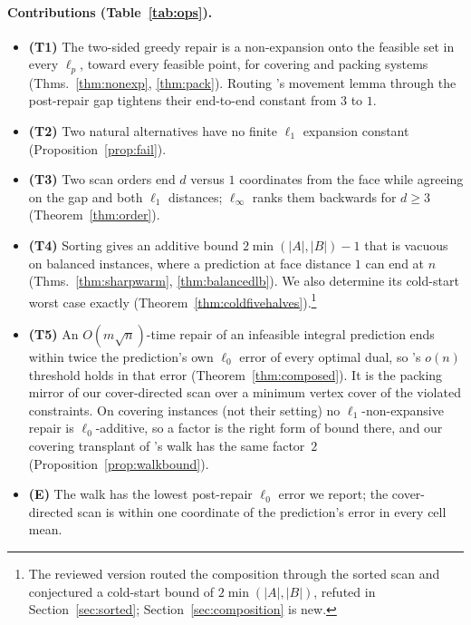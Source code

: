 \paragraph{Contributions (Table~\ref{tab:ops}).}
\begin{itemize}\setlength{\itemsep}{0pt}
\item \textbf{(T1)} The two-sided greedy repair is a non-expansion onto the feasible set in every
$\ell_p$, toward every feasible point, for covering and packing systems (Thms.~\ref{thm:nonexp},
\ref{thm:pack}). Routing \citeauthor{dinitz2021}'s movement lemma through the post-repair gap
tightens their end-to-end constant from $3$ to $1$.
\item \textbf{(T2)} Two natural alternatives have no finite $\ell_1$ expansion constant
(Proposition~\ref{prop:fail}).
\item \textbf{(T3)} Two scan orders end $d$ versus $1$ coordinates from the face while agreeing on
the gap and both $\ell_1$ distances; $\ell_\infty$ ranks them backwards for $d \ge 3$
(Theorem~\ref{thm:order}).
\item \textbf{(T4)} Sorting gives an additive bound $2\min(|A|,|B|)-1$ that is vacuous on balanced
instances, where a prediction at face distance $1$ can end at $n$ (Thms.~\ref{thm:sharpwarm},
\ref{thm:balancedlb}). We also determine its cold-start worst case
exactly (Theorem~\ref{thm:coldfivehalves}).\footnote{The reviewed version routed the composition through the sorted scan and conjectured a
cold-start bound of $2\min(|A|,|B|)$, refuted in Section~\ref{sec:sorted}; Section~\ref{sec:composition} is new.}
\item \textbf{(T5)} An $O(m\sqrt{n})$-time repair of an infeasible integral prediction ends within
twice the prediction's own $\ell_0$ error of every optimal dual, so \citeauthor{chen2022}'s $o(n)$
threshold holds in that error (Theorem~\ref{thm:composed}). It is the packing mirror of our
cover-directed scan over a minimum vertex cover of the violated constraints. On covering instances (not their setting) no $\ell_1$-non-expansive repair is
$\ell_0$-additive, so a factor is the right form of bound there, and our covering transplant of
\citeauthor{dinitz2021}'s walk has the same factor~$2$ (Proposition~\ref{prop:walkbound}).
\item \textbf{(E)} The walk has the lowest post-repair $\ell_0$ error we report; the cover-directed scan
is within one coordinate of the prediction's error in every cell mean.
\end{itemize}

